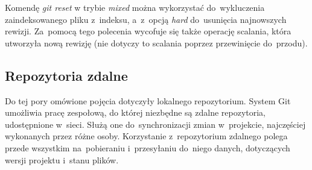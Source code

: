 \documentclass[12pt,a4paper,polish,thesis]{dcsbook}
\begin{document}
	Komendę \textit{git reset} w trybie \textit{mixed} można wykorzystać do~wykluczenia zaindeksowanego pliku z~indeksu, a~z~opcją \textit{hard} do~usunięcia najnowszych rewizji. Za~pomocą tego polecenia wycofuje się także operację scalania, która utworzyła nową rewizję (nie dotyczy to scalania poprzez przewinięcie do~przodu).

	\subsection{Repozytoria zdalne}
	Do tej pory omówione pojęcia dotyczyły lokalnego repozytorium. System Git umożliwia pracę zespołową, do której niezbędne są zdalne repozytoria, udostępnione w~sieci. Służą one do~synchronizacji zmian w~projekcie, najczęściej wykonanych przez różne osoby. Korzystanie z~repozytorium zdalnego polega przede wszystkim na~pobieraniu i~przesyłaniu do~niego danych, dotyczących wersji projektu i~stanu plików.
\end{document}
